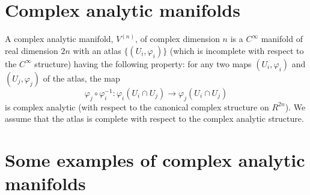 \section*{Complex analytic manifolds}

A complex analytic manifold, $V^{(n)}$, of complex dimension $n$ is a
$C^{\infty}$ manifold of real dimension $2n$ with an atlas
$\{(U_{i},\varphi_{i})\}$ (which is incomplete with respect to the
$C^{\infty}$ structure) having the following property: for any two
maps $(U_{i},\varphi_{i})$ and $(U_{j},\varphi_{j})$ of the atlas, the
map
$$
\varphi_{j}\circ \varphi^{-1}_{i}:\varphi_{i}(U_{i}\cap U_{j})\to
\varphi_{j}(U_{i}\cap U_{j})
$$
is complex analytic (with respect to the canonical complex structure
on $R^{2n}$). We assume that the atlas is complete with respect to the
complex analytic structure.

\section*{Some examples of complex analytic manifolds}

